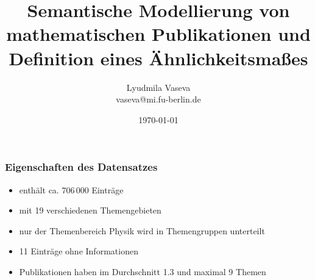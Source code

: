 \documentclass[12pt, xcolor=table]{beamer}
\begin{document}
\title{Semantische Modellierung von mathematischen Publikationen und Definition eines Ähnlichkeitsmaßes}
\author[Lyudmila Vaseva]{Lyudmila Vaseva\\{vaseva@mi.fu-berlin.de}}
\date{\today}

\begin{frame}
	\titlepage
\end{frame}

\begin{frame}
	\frametitle{Eigenschaften des Datensatzes}
	\begin{itemize}
		\item  enthält ca. $706\,000$ Einträge
		\item  mit 19 verschiedenen Themengebieten
		\item  nur der Themenbereich Physik wird in Themengruppen unterteilt
		\item  11 Einträge ohne Informationen
		\item  Publikationen haben im Durchschnitt 1.3 und maximal 9 Themen
	\end{itemize}
\end{frame}
\end{document}
